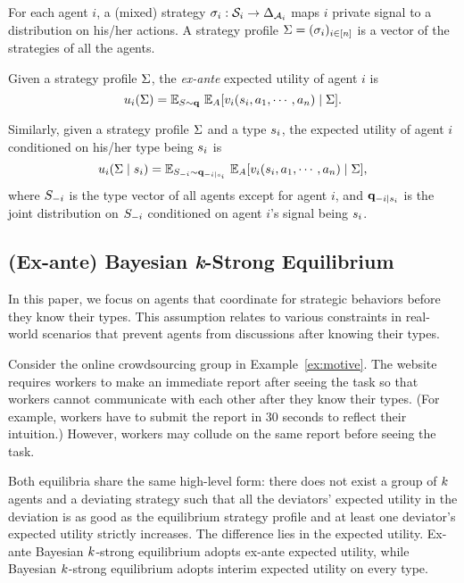 For each agent $i$, a (mixed) strategy $\sigma_i: \mathcal{S}_i \to \Delta_{\mathcal{A}_i}$ maps $i$ private signal to a distribution on his/her actions. A strategy profile $\Sigma = (\sigma_i)_{i \in [n]}$ is a vector of the strategies of all the agents. 

Given a strategy profile $\Sigma$, the {\em ex-ante} expected utility of agent $i$ is 
\begin{equation*}
    \ut_i(\stgp) = \Ex_{S \sim \prQ}\ \Ex_{A}[\vt_i(\sigi_i, \rp_1, \cdots, \rp_n)\mid \stgp].
\end{equation*}

Similarly, given a strategy profile $\Sigma$ and a type $s_i$, the {\em \qi{}} expected utility of agent $i$ conditioned on his/her type being $s_i$ is 
\begin{equation*}
    u_i(\Sigma \mid s_i) = \mathbb{E}_{S_{-i} \sim \mathbf{q}_{-i\mid s_i}}\ \mathbb{E}_{A}[v_i(s_i, a_1, \cdots, a_n)\mid \Sigma],
\end{equation*}
where $S_{-i}$ is the type vector of all agents except for agent $i$, and $\mathbf{q}_{-i\mid s_i}$ is the joint distribution on $S_{-i}$ conditioned on agent $i$'s signal being $s_{i}$. 

\subsection{(Ex-ante) Bayesian \textit{k}-Strong Equilibrium}
In this paper, we focus on agents that coordinate for strategic behaviors before they know their types. This assumption relates to various constraints in real-world scenarios that prevent agents from discussions after knowing their types. 
\begin{example}
    Consider the online crowdsourcing group in Example~\ref{ex:motive}. The website requires workers to make an immediate report after seeing the task so that workers cannot communicate with each other after they know their types. (For example, workers have to submit the report in 30 seconds to reflect their intuition.) However, workers may collude on the same report before seeing the task.
\end{example}
Both equilibria share the same high-level form: there does not exist a group of $k$ agents and a deviating strategy such that all the deviators' expected utility in the deviation is as good as the equilibrium strategy profile and at least one deviator's expected utility strictly increases. The difference lies in the expected utility. Ex-ante Bayesian $k$-strong equilibrium adopts ex-ante expected utility, while Bayesian $k$-strong equilibrium adopts interim expected utility on every type. 


